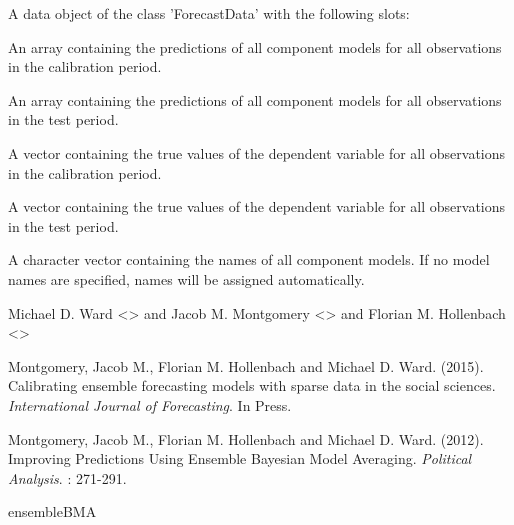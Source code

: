 \documentclass[a4paper]{book}
\begin{document}
%
\begin{Value}
A data object of the class 'ForecastData' with the following slots:
\begin{ldescription}
\item[\code{predCalibration}] An array containing the predictions of all component models for all observations in the calibration period.
\item[\code{predTest}] An array containing the predictions of all component models for all observations in the test period.
\item[\code{outcomeCalibration}] A vector containing the true values of the dependent variable for all observations in the calibration period.
\item[\code{outcomeTest}] A vector containing the true values of the dependent variable for all observations in the test period.
\item[\code{modelNames}] A character vector containing the names of all component models.  If no model names are specified, names will be assigned automatically.
\end{ldescription}
\end{Value}
%
\begin{Author}\relax
Michael D. Ward <> and Jacob M. Montgomery <> and Florian M. Hollenbach <>
\end{Author}
%
\begin{References}\relax
Montgomery, Jacob M., Florian M. Hollenbach and Michael D. Ward. (2015). Calibrating ensemble forecasting models with sparse data in the social sciences.   \emph{International Journal of Forecasting}. In Press.

Montgomery, Jacob M., Florian M. Hollenbach and Michael D. Ward. (2012). Improving Predictions Using Ensemble Bayesian Model Averaging. \emph{Political Analysis}. : 271-291.
\end{References}
%
\begin{SeeAlso}\relax
ensembleBMA
\end{SeeAlso}
%
\end{document}
